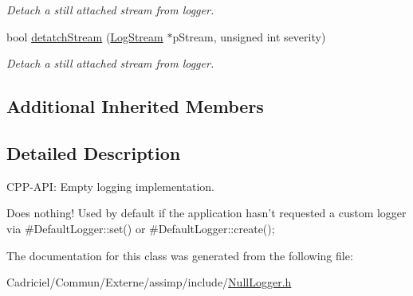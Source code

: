 \begin{DoxyCompactItemize}
\begin{DoxyCompactList}\small\item\em Detach a still attached stream from logger. \end{DoxyCompactList}\item 
\hypertarget{class_assimp_1_1_null_logger_ab49b14a0045aab73b813a448b5aa77b4}{bool \hyperlink{class_assimp_1_1_null_logger_ab49b14a0045aab73b813a448b5aa77b4}{detatch\-Stream} (\hyperlink{class_assimp_1_1_log_stream}{Log\-Stream} $\ast$p\-Stream, unsigned int severity)}\label{class_assimp_1_1_null_logger_ab49b14a0045aab73b813a448b5aa77b4}

\begin{DoxyCompactList}\small\item\em Detach a still attached stream from logger. \end{DoxyCompactList}\end{DoxyCompactItemize}
\subsection*{Additional Inherited Members}


\subsection{Detailed Description}
C\-P\-P-\/\-A\-P\-I\-: Empty logging implementation. 

Does nothing! Used by default if the application hasn't requested a custom logger via \#\-Default\-Logger\-::set() or \#\-Default\-Logger\-::create(); 

The documentation for this class was generated from the following file\-:\begin{DoxyCompactItemize}
\item 
Cadriciel/\-Commun/\-Externe/assimp/include/\hyperlink{_null_logger_8h}{Null\-Logger.\-h}\end{DoxyCompactItemize}
